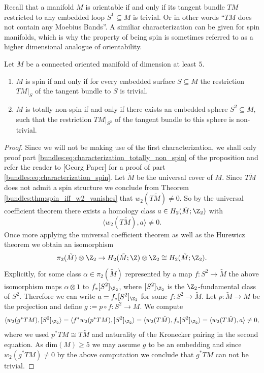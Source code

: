 Recall that a manifold $M$ is orientable if and only if its tangent bundle $TM$ restricted to any embedded loop $S^1 \subseteq M$ is trivial. Or in other words ``$TM$ does not contain any Moebius Bands''. A similiar characterization can be given for spin manifolds, which is why the property of being spin is sometimes referred to as a higher dimensional analogue of orientability.

\begin{proposition}
    \label{bundles:prop:spin_characterisation}
    Let $M$ be a connected oriented manifold of dimension at least $5$.
    \begin{enumerate}[label=\roman*)]
        \item \label{bundles:eq:characterization_spin} $M$ is spin if and only if for every embedded surface $S \subseteq M$ the restriction $TM|_S$ of the tangent bundle to $S$ is trivial.
        \item \label{bundles:eq:characterization_totally_non_spin} $M$ is totally non-spin if and only if there exists an embedded sphere $S^2 \subseteq M$, such that the restriction $TM|_{S^2}$ of the tangent bundle to this sphere is non-trivial.
    \end{enumerate}
\end{proposition}

\begin{proof}
    Since we will not be making use of the first characterization, we shall only proof part \ref{bundles:eq:characterization_totally_non_spin} of the proposition and refer the reader to [Georg Paper] for a proof of part \ref{bundles:eq:characterization_spin}. Let $\tilde{M}$ be the universal cover of $M$. Since $T\tilde{M}$ does not admit a spin structure we conclude from Theorem \ref{bundles:thm:spin_iff_w2_vanishes} that $w_2(T\tilde{M}) \neq 0$. So by the universal coefficient theorem there exists a homology class $a \in H_2(\tilde{M};\Z_2)$ with 
    \[
    \langle w_2(T\tilde{M}), a\rangle \neq 0.
    \]
    Once more applying the universal coefficient theorem as well as the Hurewicz theorem we obtain an isomorphism
    \[
    \pi_2(\tilde{M}) \otimes \Z_2 \to H_2(\tilde{M};\Z) \otimes \Z_2 \cong H_2(\tilde{M};\Z_2). 
    \]
    Explicitly, for some class $\alpha \in \pi_2(\tilde{M})$ represented by a map $f \colon S^2 \to \tilde{M}$ the above isomorphism maps $\alpha \otimes 1$ to $f_\ast [S^2]_{\Z_2}$, where $[S^2]_{\Z_2}$ is the $\Z_2$-fundamental class of $S^2$. Therefore we can write $a = f_\ast [S^2]_{\Z_2}$ for some $f \colon S^2 \to \tilde{M}$. Let $p \colon \tilde{M} \to M$ be the projection and define $g := p \circ f \colon S^2 \to M$. We compute 
    \[
    \langle w_2(g^\ast TM), [S^2]_{\Z_2}\rangle = \langle f^\ast w_2(p^\ast TM), [S^2]_{\Z_2}\rangle = \langle w_2(T\tilde{M}), f_\ast [S^2]_{\Z_2}\rangle = \langle w_2(T\tilde{M}), a \rangle \neq 0,
    \]
    where we used $p^\ast TM \cong T \tilde{M}$ and naturality of the Kronecker pairing in the second equation. As $\mathrm{dim}(M) \geq 5$ we may assume $g$ to be an embedding and since $w_2(g^\ast TM) \neq 0$ by the above computation we conclude that $g^\ast TM$ can not be trivial.
\end{proof}

